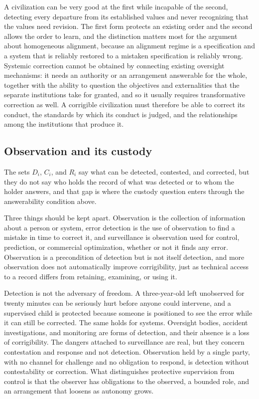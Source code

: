 \documentclass[11pt]{article}
\begin{document}
A civilization can be very good at the first while incapable of the second, detecting every departure from its established values and never recognizing that the values need revision. The first form protects an existing order and the second allows the order to learn, and the distinction matters most for the argument about homogeneous alignment, because an alignment regime is a specification and a system that is reliably restored to a mistaken specification is reliably wrong. Systemic correction cannot be obtained by connecting existing oversight mechanisms: it needs an authority or an arrangement answerable for the whole, together with the ability to question the objectives and externalities that the separate institutions take for granted, and so it usually requires transformative correction as well. A corrigible civilization must therefore be able to correct its conduct, the standards by which its conduct is judged, and the relationships among the institutions that produce it.

\subsection{Observation and its custody}

The sets $D_i$, $C_i$, and $R_i$ say what can be detected, contested, and corrected, but they do not say who holds the record of what was detected or to whom the holder answers, and that gap is where the custody question enters through the answerability condition above.

Three things should be kept apart. Observation is the collection of information about a person or system, error detection is the use of observation to find a mistake in time to correct it, and surveillance is observation used for control, prediction, or commercial optimization, whether or not it finds any error. Observation is a precondition of detection but is not itself detection, and more observation does not automatically improve corrigibility, just as technical access to a record differs from retaining, examining, or using it.

Detection is not the adversary of freedom. A three-year-old left unobserved for twenty minutes can be seriously hurt before anyone could intervene, and a supervised child is protected because someone is positioned to see the error while it can still be corrected. The same holds for systems. Oversight bodies, accident investigations, and monitoring are forms of detection, and their absence is a loss of corrigibility. The dangers attached to surveillance are real, but they concern contestation and response and not detection. Observation held by a single party, with no channel for challenge and no obligation to respond, is detection without contestability or correction. What distinguishes protective supervision from control is that the observer has obligations to the observed, a bounded role, and an arrangement that loosens as autonomy grows.
\end{document}
